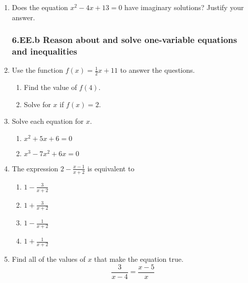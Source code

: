 \documentclass[12pt, twoside]{article}
\begin{document}
\begin{enumerate}[itemsep=0.5cm]
\item Does the equation $x^2 - 4x + 13 = 0$ have imaginary solutions? Justify your answer.

\subsubsection*{6.EE.b Reason about and solve one-variable equations and inequalities}

\item Use the function $f(x) = \frac{1}{2}x + 11$ to answer the questions.
    \begin{multicols}{2}
    \begin{enumerate}[itemsep=2cm]
        \item Find the value of $f(4)$.
        \item Solve for $x$ if $f(x) = 2$.
    \end{enumerate}
    \end{multicols} \vspace{2cm}

    
\item Solve each equation for $x$.
\begin{multicols}{2}
    \begin{enumerate}
    \item $x^2+5x+6 = 0$
    \item $x^3-7x^2+6x = 0$ 
    \end{enumerate} 
\end{multicols} \vspace{3cm}

\item The expression $\displaystyle 2 - \frac{x - 1}{x + 2}$ is equivalent to 
\begin{multicols}{2}
    \begin{enumerate}
    \item $\displaystyle 1 - \frac{3}{x + 2}$
    \item $\displaystyle 1 + \frac{3}{x + 2}$ 
    \item $\displaystyle 1 - \frac{1}{x + 2}$
    \item $\displaystyle 1 + \frac{1}{x + 2}$ 
    \end{enumerate} 
\end{multicols} 

\item Find all of the values of $x$ that make the equation true. 
$$\frac{3}{x-4} = \frac{x-5}{x}$$ \vspace{4cm}


\end{enumerate}
\end{document}
